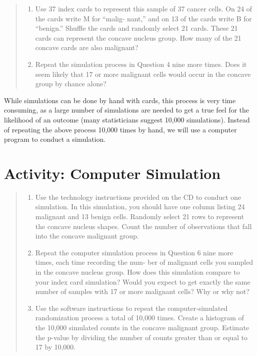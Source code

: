 \documentclass[
]{report}
\providecommand{\tightlist}{%
  \setlength{\itemsep}{0pt}\setlength{\parskip}{0pt}}
\begin{document}
\begin{quote}
\begin{enumerate}
\def\labelenumi{\arabic{enumi}.}
\setcounter{enumi}{3}
\tightlist
\item
  Use 37 index cards to represent this sample of 37 cancer cells. On 24 of the cards write M for ``malig-
  nant,'' and on 13 of the cards write B for ``benign.'' Shuffle the cards and randomly select 21 cards. These
  21 cards can represent the concave nucleus group. How many of the 21 concave cards are also malignant?
\item
  Repeat the simulation process in Question 4 nine more times. Does it seem likely that 17 or more
  malignant cells would occur in the concave group by chance alone?
\end{enumerate}
\end{quote}

While simulations can be done by hand with cards, this process is very time consuming, as a large number
of simulations are needed to get a true feel for the likelihood of an outcome (many statisticians suggest
10,000 simulations). Instead of repeating the above process 10,000 times by hand, we will use a computer
program to conduct a simulation.

\hypertarget{activity-computer-simulation}{%
\section*{Activity: Computer Simulation}\label{activity-computer-simulation}}

\begin{quote}
\begin{enumerate}
\def\labelenumi{\arabic{enumi}.}
\setcounter{enumi}{5}
\tightlist
\item
  Use the technology instructions provided on the CD to conduct one simulation. In this simulation, you
  should have one column listing 24 malignant and 13 benign cells. Randomly select 21 rows to represent
  the concave nucleus shapes. Count the number of observations that fall into the concave malignant group.
\item
  Repeat the computer simulation process in Question 6 nine more times, each time recording the num-
  ber of malignant cells you sampled in the concave nucleus group. How does this simulation compare to
  your index card simulation? Would you expect to get exactly the same number of samples with 17 or
  more malignant cells? Why or why not?
\item
  Use the software instructions to repeat the computer-simulated randomization process a total of 10,000
  times. Create a histogram of the 10,000 simulated counts in the concave malignant group. Estimate the
  p-value by dividing the number of counts greater than or equal to 17 by 10,000.
\end{enumerate}
\end{quote}
\end{document}
